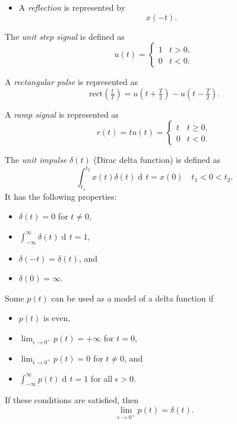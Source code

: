 \documentclass[10pt,letterpaper]{article}
\DeclareMathOperator{\di}{d\!} %
\newcommand{\bracks}[1]{ \left( #1 \right) } %
\newcommand{\tpfrac}[2]{\left(\tfrac{#1}{#2}\right)} %
\newcommand{\rect}{ \text{rect} }
\newcommand{\impulse}{ \delta(t) }
\newcommand{\Iint}{ \int_{-\infty}^{\infty} }
\newcommand{\tint}{ \int_{t_1}^{t_2} }
\begin{document}
\begin{multicols*}{3}
\begin{itemize}[leftmargin=0.5cm]
\item A \textit{reflection} is represented by
\[ x(-t). \]


\end{itemize}

The \textit{unit step signal} is defined as
\[ u(t) = \begin{cases} 
      		1 & t > 0, \\
      		0 & t < 0. 
   		\end{cases}
\]

A \textit{rectangular pulse} is represented as
\[ \rect\tpfrac{t}{T} = u\bracks{t + \tfrac{T}{2}} - u\bracks{t - \tfrac{T}{2}}. \]

A \textit{ramp signal} is represented as
\[ r(t) = tu(t) = \begin{cases} 
		      		t & t \geq 0, \\
		      		0 & t < 0. 
		   		\end{cases}
\]

The \textit{unit impulse} $\impulse$ (Dirac delta function) is defined as
\[ \tint x(t) \impulse \di t = x(0) \quad t_1 < 0 < t_2. \]
It has the following properties:
\begin{itemize}[leftmargin=0.5cm]
\item $\impulse = 0$ for $t \neq 0$,
\item $\displaystyle \Iint \impulse \di t = 1$,
\item $\delta(-t) = \impulse$, and
\item $\delta(0) = \infty$.
\end{itemize}

Some $p(t)$ can be used as a model of a delta function if
\begin{itemize}[leftmargin=0.5cm]
\item $p(t)$ is even,
\item $\displaystyle \lim_{\epsilon \rightarrow 0^+} p(t) = +\infty$ for $t = 0$,
\item $\displaystyle \lim_{\epsilon \rightarrow 0^+} p(t) = 0$ for $t \neq 0$, and
\item $\displaystyle \Iint p(t) \di t = 1$ for all $\epsilon > 0$.
\end{itemize}
If these conditions are satisfied, then
\[ \lim_{\epsilon \rightarrow 0^+} p(t) = \impulse. \]


\end{multicols*}
\end{document}
